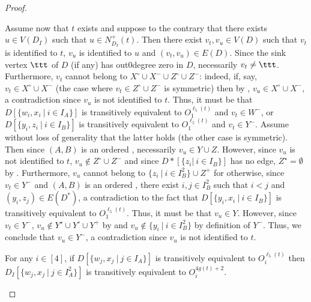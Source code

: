 \begin{proof}
\begin{claimproof}
Assume now that $t$ exists and suppose to the contrary that there exists $u \in V(D_I)$ such that $u \in N^+_{D_I}(t)$.
Then there exist $v_t,v_u \in V(D)$ such that $v_t$ is identified to $t$, $v_u$ is identified to $u$ and $(v_t,v_u) \in E(D)$.
Since the sink vertex $\ttt$ of $D$ (if any) has out0degree zero in $D$, necessarily $v_t \neq \ttt$.
Furthermore, $v_t$ cannot belong to $X^\circ \cup X^- \cup Z^\circ \cup Z^-$: indeed, if, say, $v_t \in X^\circ \cup X^-$ (the case where $v_t \in Z^\circ \cup Z^-$ is symmetric) then by , $v_u \in X^\circ \cup X^-$,
a contradiction since $v_u$ is not identified to $t$.
Thus, it must be that $D[\{w_i,x_i~|~i \in I_A\}]$ is transitively equivalent to $O_1^{\ell_5(t)}$ and $v_t \in W^-$, or
$D[\{y_i,z_i~|~i \in I_B\}]$ is transitively equivalent to $O_1^{\ell_5(t)}$ and $v_t \in Y^-$.
Assume without loss of generality that the latter holds (the other case is symmetric).
Then since $(A,B)$ is an ordered \toughpair, necessarily $v_u \in Y \cup Z$.
However, since $v_u$ is not identified to $t$, $v_u \notin Z^\circ \cup Z^-$
and since $D*[\{z_i|~i \in I_B\}]$ has no edge, $Z^\star = \emptyset$ by .
Furthermore, $v_u$ cannot belong to $\{z_i~|~i \in I_B^2\} \cup Z^+$ for otherwise, since $v_t \in Y^-$ and $(A,B)$ is an ordered \toughpair, there exist $i,j \in I_B^2$ such that $i < j$ and $(y_i,z_j) \in E(D^*)$, a contradiction to the fact that $D[\{y_i,x_i~|~i \in I_B\}]$ is transitively equivalent to $O_1^{\ell_5(t)}$.
Thus, it must be that $v_u \in Y$.
However, since $v_t \in Y^-$, $v_u \notin Y^\star \cup Y^\circ \cup Y^+$ by 
and $v_u \notin \{y_i~|~i \in I_B^2\}$ by definition of $Y^-$.
Thus, we conclude that $v_u \in Y^-$, a contradiction since $v_u$ is not identified to $t$. 
\end{claimproof}

\begin{claim}
\label{clm:sameinDIWX}
For any $i \in [4]$, if $D[\{w_j,x_j~|~j\in I_A\}]$ is transitively equivalent to $O_i^{\ell_5(t)}$ then
$D_I[\{w_j,x_j~|~j \in I_A^2\}]$ is transitively equivalent to $O_i^{4g(t)+2}$.
\end{claim}


\end{proof}
